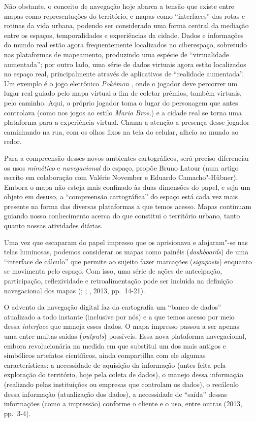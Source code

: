 Não obstante, o conceito de navegação hoje abarca a tensão que existe
entre mapas como representações do território, e mapas como
``interfaces'' das rotas e rotinas da vida urbana, podendo ser
considerado uma forma central da mediação entre os espaços, %
temporalidades e experiências da cidade. Dados e informações do mundo
real estão agora frequentemente localizados no ciberespaço, sobretudo
nas plataformas de mapeamento, produzindo uma espécie de ``virtualidade
aumentada''; por outro lado, uma série de dados virtuais agora estão
localizados no espaço real, principalmente através de aplicativos de
``realidade aumentada''. Um exemplo é o jogo eletrônico \emph{Pokémon
}, onde o jogador deve percorrer um lugar real guiado pelo mapa
virtual a fim de coletar prêmios, também virtuais, pelo caminho. Aqui, o
próprio jogador toma o lugar do personagem que antes controlava (como
nos jogos ao estilo \emph{Mario Bros.}) e a cidade real se torna uma
plataforma para a experiência virtual. Chama a atenção a presença desse
jogador caminhando na rua, com os olhos fixos na tela do celular, alheio
ao mundo ao redor.

Para a compreensão desses novos ambientes cartográficos, será preciso
diferenciar os usos \emph{mimético} e \emph{navegacional} do espaço,
propõe Bruno Latour (num artigo escrito em colaboração com Valérie
November e Eduardo Camacho"-Hübner). Embora o mapa não esteja mais
confinado às duas dimensões do papel, e seja um objeto em desuso, a
``compreensão cartográfica'' do espaço está cada vez mais presente na
forma das diversas plataformas a que temos acesso. Mapas continuam
guiando nosso conhecimento acerca do que constitui o território urbano,
tanto quanto nossas atividades diárias.

Uma vez que escaparam do papel impresso que os aprisionava e alojaram"-se
nas telas luminosas, podemos considerar os mapas como painéis
(\emph{dashboards}) de uma ``interface de cálculo'' que permite ao
sujeito fazer marcações (\emph{signposts}) enquanto se movimenta pelo
espaço. Com isso, uma série de ações de antecipação, participação,
reflexividade e retroalimentação pode ser incluída na definição
navegacional dos mapas (; ; , 2013, pp.~14-21).

O advento da navegação digital faz da cartografia um ``banco de dados''
atualizado a todo instante (inclusive por nós) e a que temos acesso por
meio dessa \emph{interface} que maneja esses dados. O mapa impresso
passou a ser apenas uma entre muitas saídas (\emph{outputs}) possíveis.
Essa nova plataforma navegacional, embora revolucionária na medida em
que substitui um dos mais antigos e simbólicos artefatos científicos,
ainda compartilha com ele algumas características: a necessidade de
aquisição da informação (antes feita pela exploração do território, hoje
pela coleta de dados), o manejo dessa informação (realizado pelas
instituições ou empresas que controlam os dados), o recálculo dessa
informação (atualização dos dados), a necessidade de ``saída'' dessas
informações (como a impressão) conforme o cliente e o uso, entre outras
(2013, pp.~3-4).

